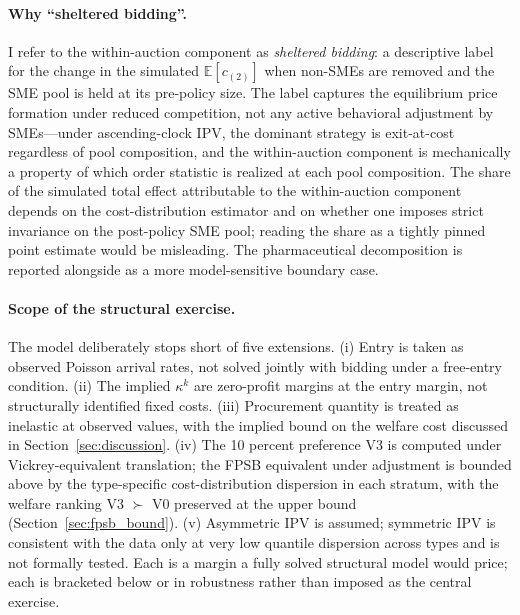 \paragraph{Why ``sheltered bidding''.} I refer to the within-auction component as \emph{sheltered bidding}: a descriptive label for the change in the simulated $\mathbb{E}[c_{(2)}]$ when non-SMEs are removed and the SME pool is held at its pre-policy size. The label captures the equilibrium price formation under reduced competition, not any active behavioral adjustment by SMEs---under ascending-clock IPV, the dominant strategy is exit-at-cost regardless of pool composition, and the within-auction component is mechanically a property of which order statistic is realized at each pool composition. The share of the simulated total effect attributable to the within-auction component depends on the cost-distribution estimator and on whether one imposes strict invariance on the post-policy SME pool; reading the share as a tightly pinned point estimate would be misleading. The pharmaceutical decomposition is reported alongside as a more model-sensitive boundary case.

\paragraph{Scope of the structural exercise.} The model deliberately stops short of five extensions. (i) Entry is taken as observed Poisson arrival rates, not solved jointly with bidding under a free-entry condition. (ii) The implied $\kappa^k$ are zero-profit margins at the entry margin, not structurally identified fixed costs. (iii) Procurement quantity is treated as inelastic at observed values, with the implied bound on the welfare cost discussed in Section~\ref{sec:discussion}. (iv) The 10 percent preference V3 is computed under Vickrey-equivalent translation; the FPSB equivalent under \citet{maskinriley2000} adjustment is bounded above by the type-specific cost-distribution dispersion in each stratum, with the welfare ranking V3 $\succ$ V0 preserved at the upper bound (Section~\ref{sec:fpsb_bound}). (v) Asymmetric IPV is assumed; symmetric IPV is consistent with the data only at very low quantile dispersion across types and is not formally tested. Each is a margin a fully solved structural model would price; each is bracketed below or in robustness rather than imposed as the central exercise.
